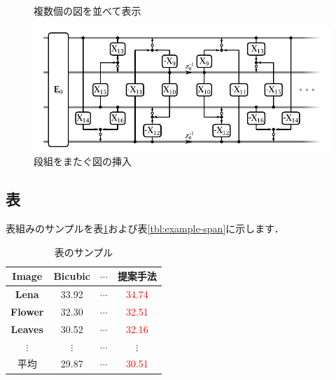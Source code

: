 \documentclass[a4paper,10pt]{ikelab-seminar}
\begin{document}
\begin{figure}[t]
\begin{minipage}{.45\hsize}
   \end{minipage}
   \caption{複数個の図を並べて表示}
   \label{fig:example-subcaption}
\end{figure}

\begin{figure}[t]
   \centering
   \includegraphics[width=.6\hsize]{figure/example-pdf.pdf}
   \caption{段組をまたぐ図の挿入}
\end{figure}

\subsection{表}
表組みのサンプルを表\ref{tbl:example}および表\ref{tbl:example-span}に示します．

\begin{table}[t]
   \centering
   \caption{表のサンプル}
   \label{tbl:example}
   \begin{tabular}{c|ccc}
      \hline
      \textbf{Image}  & Bicubic  & $\cdots$ & 提案手法 \\ %
      \hline
      \textbf{Lena}   & 33.92    & $\cdots$ & \textcolor{red}{34.74} \\
      \textbf{Flower} & 32.30    & $\cdots$ & \textcolor{red}{32.51} \\
      \textbf{Leaves} & 30.52    & $\cdots$ & \textcolor{red}{32.16} \\
      $\vdots$        & $\vdots$ & $\cdots$ &    $\vdots$            \\
      \hline
      平均             & 29.87    & $\cdots$ & \textcolor{red}{30.51} \\
      \hline
   \end{tabular}
\end{table}
\end{document}
